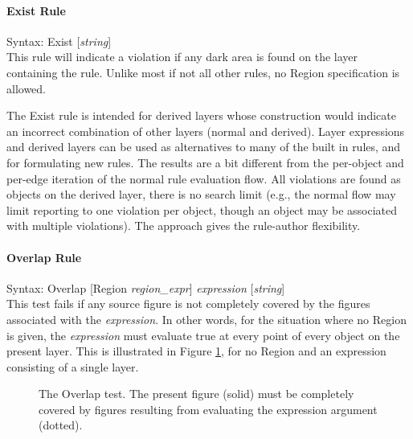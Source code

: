 \paragraph{{\et Exist} Rule}

\begin{description}
\item{Syntax: {\vt Exist} [{\it string\/}]}\\

This rule will indicate a violation if any dark area is found on the
layer containing the rule.  Unlike most if not all other rules, no
{\et Region} specification is allowed.
 
The {\et Exist} rule is intended for derived layers whose construction
would indicate an incorrect combination of other layers (normal and
derived).  Layer expressions and derived layers can be used as
alternatives to many of the built in rules, and for formulating new
rules.  The results are a bit different from the per-object and
per-edge iteration of the normal rule evaluation flow.  All violations
are found as objects on the derived layer, there is no search limit
(e.g., the normal flow may limit reporting to one violation per
object, though an object may be associated with multiple violations). 
The approach gives the rule-author flexibility.
\end{description}


\paragraph{{\et Overlap} Rule}

\begin{description}
\item{Syntax: {\vt Overlap} [{\vt Region} {\it region\_expr\/}]
   {\it expression} [{\it string\/}]}\\

This test fails if any source figure is not completely covered by the
figures associated with the {\it expression\/}.  In other words, for
the situation where no {\et Region} is given, the {\it expression}
must evaluate true at every point of every object on the present
layer.  This is illustrated in Figure \ref{drcoverlap}, for no {\et
Region} and an expression consisting of a single layer.
\end{description}

\begin{figure}
\caption{\label{drcoverlap} The {\et Overlap} test.  The present figure
(solid) must be completely covered by figures resulting from evaluating
the expression argument (dotted).}
\vspace{1.5ex}
\begin{center}
\end{center}
\end{figure}

